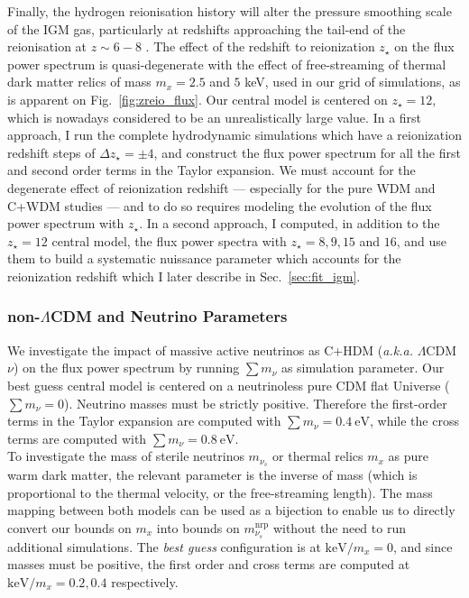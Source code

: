 Finally, the hydrogen reionisation history will alter the pressure 
smoothing scale of the IGM gas, particularly at redshifts approaching the 
tail-end of the reionisation at $z \sim 6-8$ \citep{Gnedin1998}. The effect of the redshift to reionization $z_\star$ on the flux power spectrum is quasi-degenerate with the effect of free-streaming of thermal dark matter relics of mass $m_x = 2.5$ and $5$ keV, used in our grid of simulations, as is apparent on Fig.~\ref{fig:zreio_flux}. Our central model is centered on $z_\star = 12$, which is nowadays considered to be an unrealistically large value. In a first approach, I run the complete hydrodynamic simulations which have a reionization redshift steps of $\Delta z_\star = \pm 4$, and construct the flux power spectrum for all the first and second order terms in the Taylor expansion. We must account for the degenerate effect of reionization redshift --- especially for the pure WDM and C+WDM studies --- and to do so requires modeling the evolution of the flux power spectrum with $z_\star$. In a second approach, I computed, in addition to the $z_\star = 12$ central model, the flux power spectra with $z_\star = 8, 9, 15$ and $16$, and use them to build a systematic nuissance parameter which accounts for the reionization redshift which I later describe in Sec.~\ref{sec:fit_igm}.

\subsubsection{non-$\Lambda$CDM and Neutrino Parameters}
\label{sec:ncdm_param}

We investigate the impact of massive active neutrinos as C+HDM (\textit{a.k.a.} $\Lambda$CDM$\nu$) on the flux power spectrum by running $\sum m_\nu$ as simulation parameter. Our best guess central model is centered on a neutrinoless pure CDM flat Universe ($\sum m_\nu = 0$). Neutrino masses must be strictly positive. Therefore the first-order terms in the Taylor expansion are computed with $\sum m_\nu = 0.4~\mathrm{eV}$, while the cross terms are computed with $\sum m_\nu = 0.8~\mathrm{eV}$. \\

To investigate the mass of sterile neutrinos $m_{\nu_s}$ or thermal relics $m_x$ as pure warm dark matter, the relevant parameter is the inverse of mass (which is proportional to the thermal velocity, or the free-streaming length). The mass mapping between both models can be used as a bijection to enable us to directly convert our bounds on $m_x$ into bounds on $m^{\mathrm{nrp}}_{\nu_s}$ without the need to run additional simulations. The \emph{best guess} configuration is at $\mathrm{keV}/m_x = 0$, and since masses must be positive, the first order and cross terms are computed at $\mathrm{keV}/m_x = 0.2, 0.4$ respectively. \\


